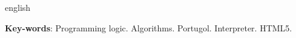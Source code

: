 \begin{resumo}[Abstract]
\begin{otherlanguage*}{english}

\vspace{\twolineskip}

\textbf{Key-words}: Programming logic. Algorithms. Portugol. Interpreter. HTML5.
\end{otherlanguage*}
\end{resumo}
